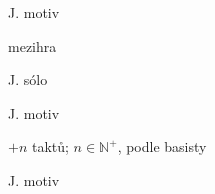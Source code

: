 \documentclass[timestamp]{jazzgrid}
\begin{document}
\begin{multicols*}{2}
\begin{description}[noitemsep,align=right,labelwidth=\widthof{\scriptsize\bfseries{\repeatsection{Tunel}}}]
	\scriptsize
	\item [Intro]
	\item [AABA] J. motiv
	\item [AABA] mezihra
	\item [AABA] J. sólo
	\item [AABA] J. motiv
	\item [\repeatsection{Tunel}] $+n$ taktů; $n\in \mathbb{N}^+$, podle basisty
	\item [Intro]
	\item [AABA] J. motiv
	\item [Intro]
\end{description}



\end{multicols*}
\end{document}
